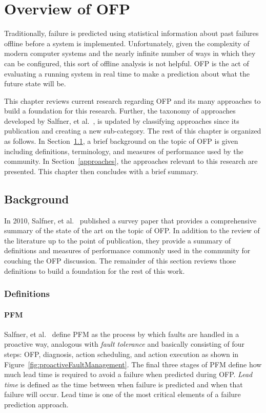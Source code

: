 \chapter{Overview of \ac{OFP}} \label{chapter2}
Traditionally, failure is predicted using statistical information about past
failures offline before a system is implemented.  Unfortunately, given the
complexity of modern computer systems and the nearly infinite number of ways in
which they can be configured, this sort of offline analysis is not helpful.
\ac{OFP} is the act of evaluating a running system in real time to make a
prediction about what the future state will be.

This chapter reviews current research regarding \ac{OFP} and its many
approaches to build a foundation for this research.  Further, the taxonomy of
approaches developed by Salfner, et al.~\cite{salfnerSurvey}, is updated by
classifying approaches since its publication and creating a new sub-category.
The rest of this chapter is organized as follows.  In Section~\ref{background},
a brief background on the topic of \ac{OFP} is given including definitions,
terminology, and measures of performance used by the community.  In
Section~\ref{approaches}, the approaches relevant to this research are
presented.  This chapter then concludes with a brief summary.

\section{Background} \label{background}
In 2010, Salfner, et al.~\cite{salfnerSurvey} published a survey paper that
provides a comprehensive summary of the state of the art on the topic of
\ac{OFP}.  In addition to the review of the literature up to the point of
publication, they provide a summary of definitions and measures of performance
commonly used in the community for couching the \ac{OFP} discussion.  The
remainder of this section reviews those definitions to build a foundation for
the rest of this work.

\subsection{Definitions} \label{definitions}
\subsubsection{\ac{PFM}} \label{pfm}
Salfner, et al.~\cite{salfnerSurvey} define \ac{PFM} as the process by which
faults are handled in a proactive way, analogous with \emph{fault tolerance}
and basically consisting of four steps: \ac{OFP}, diagnosis, action scheduling,
and action execution as shown in Figure~\ref{fig:proactiveFaultManagement}.
The final three stages of \ac{PFM} define how much lead time is required to
avoid a failure when predicted during \ac{OFP}.  \emph{Lead time} is defined as
the time between when failure is predicted and when that failure will occur.
Lead time is one of the most critical elements of a failure prediction
approach.

